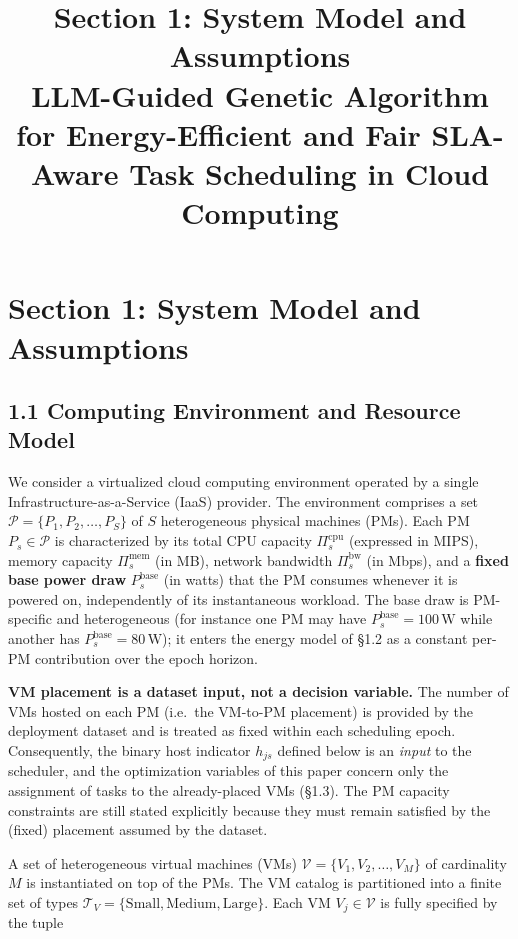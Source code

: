 \documentclass[11pt,a4paper]{article}
\title{\bfseries Section 1: System Model and Assumptions\\[4pt]
\large LLM-Guided Genetic Algorithm for Energy-Efficient and Fair SLA-Aware Task Scheduling in Cloud Computing}
\author{}
\date{}
\begin{document}
\maketitle
\vspace{-1.5cm}

\section*{Section 1: System Model and Assumptions}

\subsection*{1.1 Computing Environment and Resource Model}

We consider a virtualized cloud computing environment operated by a single Infrastructure-as-a-Service (IaaS) provider. The environment comprises a set $\mathcal{P} = \{P_1, P_2, \ldots, P_S\}$ of $S$ heterogeneous physical machines (PMs). Each PM $P_s \in \mathcal{P}$ is characterized by its total CPU capacity $\Pi^{\text{cpu}}_s$ (expressed in MIPS), memory capacity $\Pi^{\text{mem}}_s$ (in MB), network bandwidth $\Pi^{\text{bw}}_s$ (in Mbps), and a \textbf{fixed base power draw} $P^{\text{base}}_s$ (in watts) that the PM consumes whenever it is powered on, independently of its instantaneous workload. The base draw is PM-specific and heterogeneous (for instance one PM may have $P^{\text{base}}_s = 100\,\text{W}$ while another has $P^{\text{base}}_s = 80\,\text{W}$); it enters the energy model of §1.2 as a constant per-PM contribution over the epoch horizon.

\textbf{VM placement is a dataset input, not a decision variable.} The number of VMs hosted on each PM (i.e.\ the VM-to-PM placement) is provided by the deployment dataset and is treated as fixed within each scheduling epoch. Consequently, the binary host indicator $h_{js}$ defined below is an \emph{input} to the scheduler, and the optimization variables of this paper concern only the assignment of tasks to the already-placed VMs (§1.3). The PM capacity constraints are still stated explicitly because they must remain satisfied by the (fixed) placement assumed by the dataset.

A set of heterogeneous virtual machines (VMs) $\mathcal{V} = \{V_1, V_2, \ldots, V_M\}$ of cardinality $M$ is instantiated on top of the PMs. The VM catalog is partitioned into a finite set of types $\mathcal{T}_V = \{\text{Small}, \text{Medium}, \text{Large}\}$. Each VM $V_j \in \mathcal{V}$ is fully specified by the tuple
\end{document}
